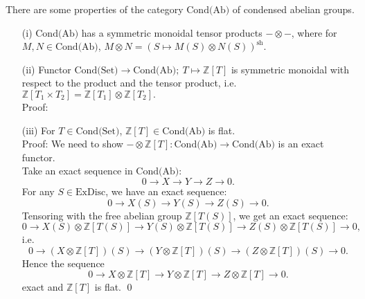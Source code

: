 \documentclass[UTF8,12,a4paper]{ctexart}
\theoremstyle{definition}
\begin{document}
\property 
There are some properties of the category $\text{Cond(Ab)}$ of condensed abelian groups.
\begin{itemize}
	\item [(i)]$\text{Cond(Ab)}$ has a symmetric monoidal tensor products $-\otimes -$, where for $M, N\in \text{Cond(Ab)}$, $M\otimes N=(S\mapsto M(S)\otimes N(S))^{\text{sh}}.$
	
	
	
	\item [(ii)] Functor $\text{Cond(Set)}\rightarrow \text{Cond(Ab)};\ T\mapsto \mathbb{Z}[T]$ is symmetric monoidal with respect to the product and the tensor product, i.e. $\mathbb{Z}[T_1\times T_2]=\mathbb{Z}[T_1]\otimes\mathbb{Z}[T_2].$\\
	Proof:
	
	
	
	
	\item [(iii)] For $T\in \text{Cond(Set)}$, $\mathbb{Z}[T]\in \text{Cond(Ab)}$ is flat.\\
	Proof: We need to show $-\otimes \mathbb{Z}[T]:\text{Cond(Ab)}\rightarrow \text{Cond(Ab)}$ is an exact functor.\\
	Take an exact sequence in $\text{Cond(Ab)}$:
	$$0\longrightarrow X\longrightarrow Y\longrightarrow Z\longrightarrow 0.$$
	For any $S\in\text{ExDisc}$, we have an exact sequence:
	$$
	0\longrightarrow X(S)\longrightarrow Y(S)\longrightarrow Z(S)\longrightarrow 0.
	$$
	Tensoring with the free abelian group $\mathbb{Z}[T(S)]$, we get an exact sequence:
	$$0\longrightarrow X(S)\otimes\mathbb{Z}[T(S)]\longrightarrow Y(S)\otimes\mathbb{Z}[T(S)]\longrightarrow Z(S)\otimes\mathbb{Z}[T(S)]\longrightarrow 0,$$
	i.e.
	$$
	0\longrightarrow(X\otimes \mathbb{Z}[T])(S)
	\longrightarrow(Y\otimes \mathbb{Z}[T])(S)
	\longrightarrow(Z\otimes \mathbb{Z}[T])(S)\longrightarrow 0.
	$$
	Hence the sequence 
	$$	0\longrightarrow X\otimes \mathbb{Z}[T]
	\longrightarrow Y\otimes \mathbb{Z}[T]
	\longrightarrow Z\otimes \mathbb{Z}[T] \longrightarrow 0.
	$$ exact and $\mathbb{Z}[T]$ is flat.
	\qed
	
	
	

\end{itemize}
\end{document}
